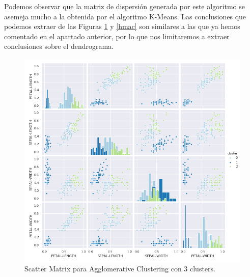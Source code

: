 \documentclass[a4paper, 20pt]{article}
\begin{document}
Podemos observar que la matriz de dispersión generada por este algoritmo se asemeja mucho a la obtenida por el algoritmo K-Means. Las conclusiones que podemos extraer de las Figuras \ref{smac} y \ref{hmac} son similares a las que ya hemos comentado en el apartado anterior, por lo que nos limitaremos a extraer conclusiones sobre el dendrograma.

\clearpage

\begin{figure}[h]
\centering
\includegraphics[scale=0.64]{dani/scatmatrixAggClusterIRIS.png}
\caption{Scatter Matrix para Agglomerative Clustering con 3 clusters.}
\label{smac}
\end{figure}

\clearpage
\end{document}
